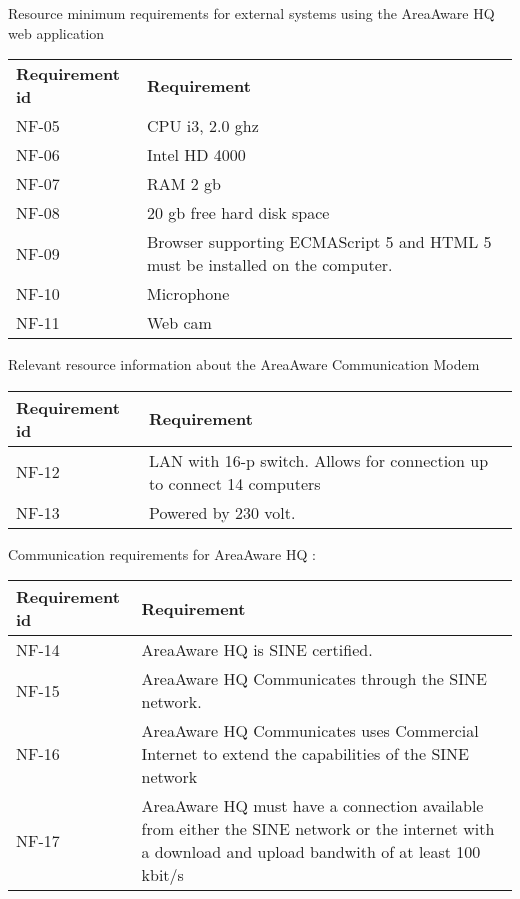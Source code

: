 Resource minimum requirements for external systems using the AreaAware HQ web application
\begin{longtable}{| p{3.2cm} |  p{10cm} | }
	\hline
	\textbf{Requirement id} &  \textbf{Requirement } \\
	NF-05 & CPU i3, 2.0 ghz \\
	\hline
	NF-06 & Intel HD 4000 \\
	\hline
	NF-07 & RAM 2 gb \\
	\hline
	NF-08 & 20 gb free hard disk space \\
	\hline
	NF-09 & Browser supporting ECMAScript 5 and HTML 5 must be installed on the computer. \\
	\hline
	NF-10 & Microphone \\
	\hline
	NF-11 & Web cam \\
	\hline
\end{longtable}


Relevant resource information about the AreaAware Communication Modem
\begin{longtable}{| p{3.2cm} |  p{10cm} | }
	\hline
	\textbf{Requirement id} &  \textbf{Requirement } \\
	\hline
	NF-12 & LAN with 16-p switch. Allows for connection up to connect 14 computers \\
	\hline
	NF-13 & Powered by 230 volt. \\
	\hline
\end{longtable}


Communication requirements for AreaAware HQ :
\begin{longtable}{| p{3.2cm} |  p{10cm} | }
	\hline
	\textbf{Requirement id} &  \textbf{Requirement } \\
	\hline
	NF-14 & AreaAware HQ is SINE certified.  \\
	\hline
	NF-15 & AreaAware HQ Communicates through the SINE network. \\
	\hline
	NF-16 & AreaAware HQ Communicates uses Commercial Internet to extend the capabilities of the SINE network \\
	\hline
	NF-17 & AreaAware HQ must have a connection available from either the SINE network or the internet with a download and upload bandwith of at least 100 kbit/s \\
	\hline
\end{longtable}




